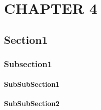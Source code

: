 \chapter{CHAPTER 4}
\label{chp:chapter4}

\section{Section1}
\subsection{Subsection1}
\subsubsection{SubSubSection1}
\subsubsection{SubSubSection2}
